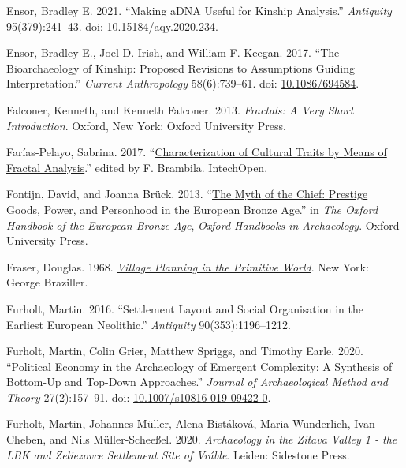 \documentclass[
  12pt,
]{book}
\newlength{\cslhangindent}
\newlength{\cslentryspacingunit} %
\newenvironment{CSLReferences}[2] %
 {%
  \setlength{\parindent}{0pt}
  \ifodd #1
  \let\oldpar\par
  \def\par{\hangindent=\cslhangindent\oldpar}
  \fi
  \setlength{\parskip}{#2\cslentryspacingunit}
 }%
 {}
\begin{document}
\begin{CSLReferences}{1}{0}
\leavevmode{}%
Ensor, Bradley E. 2021. {``Making aDNA Useful for Kinship Analysis.''} \emph{Antiquity} 95(379):241--43. doi: \href{https://doi.org/10.15184/aqy.2020.234}{10.15184/aqy.2020.234}.

\leavevmode{}%
Ensor, Bradley E., Joel D. Irish, and William F. Keegan. 2017. {``The Bioarchaeology of Kinship: Proposed Revisions to Assumptions Guiding Interpretation.''} \emph{Current Anthropology} 58(6):739--61. doi: \href{https://doi.org/10.1086/694584}{10.1086/694584}.

\leavevmode{}%
Falconer, Kenneth, and Kenneth Falconer. 2013. \emph{Fractals: A Very Short Introduction}. Oxford, New York: Oxford University Press.

\leavevmode{}%
Farías-Pelayo, Sabrina. 2017. {``\href{https://DOI:\%2010.5772/67893}{Characterization of Cultural Traits by Means of Fractal Analysis}.''} edited by F. Brambila. IntechOpen.

\leavevmode{}%
Fontijn, David, and Joanna Brück. 2013. {``\href{https://doi.org/10.1093/oxfordhb/9780199572861.013.0011}{The {Myth} of the {Chief}: {Prestige Goods}, {Power}, and {Personhood} in the {European Bronze Age}}.''} in \emph{The {Oxford Handbook} of the {European Bronze Age}}, \emph{Oxford {Handbooks} in {Archaeology}}. {Oxford University Press}.

\leavevmode{}%
Fraser, Douglas. 1968. \emph{\href{http://archive.org/details/VillagePlanningInThePrimitiveWorld}{Village Planning in the Primitive World}}. New York: George Braziller.

\leavevmode{}%
Furholt, Martin. 2016. {``Settlement Layout and Social Organisation in the Earliest European Neolithic.''} \emph{Antiquity} 90(353):1196--1212.

\leavevmode{}%
Furholt, Martin, Colin Grier, Matthew Spriggs, and Timothy Earle. 2020. {``Political Economy in the Archaeology of Emergent Complexity: A Synthesis of Bottom-Up and Top-Down Approaches.''} \emph{Journal of Archaeological Method and Theory} 27(2):157--91. doi: \href{https://doi.org/10.1007/s10816-019-09422-0}{10.1007/s10816-019-09422-0}.

\leavevmode{}%
Furholt, Martin, Johannes Müller, Alena Bistáková, Maria Wunderlich, Ivan Cheben, and Nils Müller-Scheeßel. 2020. \emph{Archaeology in the Zitava Valley 1 - the LBK and Zeliezovce Settlement Site of Vráble}. Leiden: Sidestone Press.


\end{CSLReferences}
\end{document}
